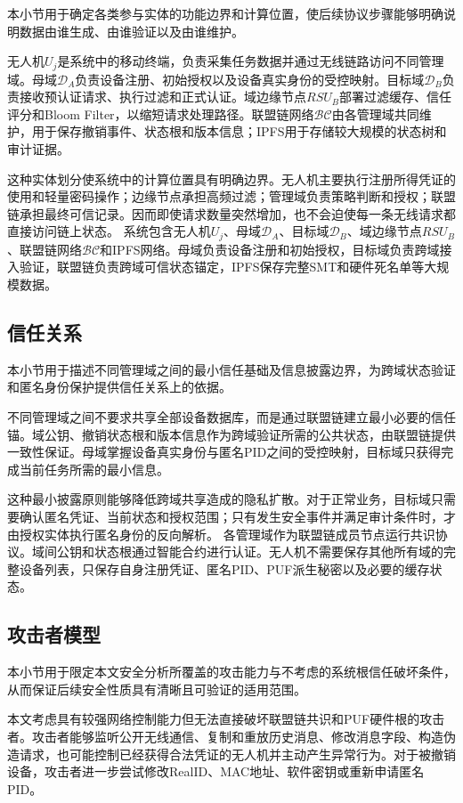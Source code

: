 \documentclass[conference]{IEEEtran}
\begin{document}
	本小节用于确定各类参与实体的功能边界和计算位置，使后续协议步骤能够明确说明数据由谁生成、由谁验证以及由谁维护。
	
	无人机$U_j$是系统中的移动终端，负责采集任务数据并通过无线链路访问不同管理域。母域$\mathcal{D}_A$负责设备注册、初始授权以及设备真实身份的受控映射。目标域$\mathcal{D}_B$负责接收预认证请求、执行过滤和正式认证。域边缘节点$RSU_B$部署过滤缓存、信任评分和Bloom Filter，以缩短请求处理路径。联盟链网络$\mathcal{BC}$由各管理域共同维护，用于保存撤销事件、状态根和版本信息；IPFS用于存储较大规模的状态树和审计证据。
	
	这种实体划分使系统中的计算位置具有明确边界。无人机主要执行注册所得凭证的使用和轻量密码操作；边缘节点承担高频过滤；管理域负责策略判断和授权；联盟链承担最终可信记录。因而即使请求数量突然增加，也不会迫使每一条无线请求都直接访问链上状态。
	系统包含无人机$U_j$、母域$\mathcal{D}_A$、目标域$\mathcal{D}_B$、域边缘节点$RSU_B$、联盟链网络$\mathcal{BC}$和IPFS网络。母域负责设备注册和初始授权，目标域负责跨域接入验证，联盟链负责跨域可信状态锚定，IPFS保存完整SMT和硬件死名单等大规模数据。
	
	\subsection{信任关系}
	
	本小节用于描述不同管理域之间的最小信任基础及信息披露边界，为跨域状态验证和匿名身份保护提供信任关系上的依据。
	
	不同管理域之间不要求共享全部设备数据库，而是通过联盟链建立最小必要的信任锚。域公钥、撤销状态根和版本信息作为跨域验证所需的公共状态，由联盟链提供一致性保证。母域掌握设备真实身份与匿名PID之间的受控映射，目标域只获得完成当前任务所需的最小信息。
	
	这种最小披露原则能够降低跨域共享造成的隐私扩散。对于正常业务，目标域只需要确认匿名凭证、当前状态和授权范围；只有发生安全事件并满足审计条件时，才由授权实体执行匿名身份的反向解析。
	各管理域作为联盟链成员节点运行共识协议。域间公钥和状态根通过智能合约进行认证。无人机不需要保存其他所有域的完整设备列表，只保存自身注册凭证、匿名PID、PUF派生秘密以及必要的缓存状态。
	
	\subsection{攻击者模型}
	
	本小节用于限定本文安全分析所覆盖的攻击能力与不考虑的系统根信任破坏条件，从而保证后续安全性质具有清晰且可验证的适用范围。
	
	本文考虑具有较强网络控制能力但无法直接破坏联盟链共识和PUF硬件根的攻击者。攻击者能够监听公开无线通信、复制和重放历史消息、修改消息字段、构造伪造请求，也可能控制已经获得合法凭证的无人机并主动产生异常行为。对于被撤销设备，攻击者进一步尝试修改RealID、MAC地址、软件密钥或重新申请匿名PID。
	
\end{document}

